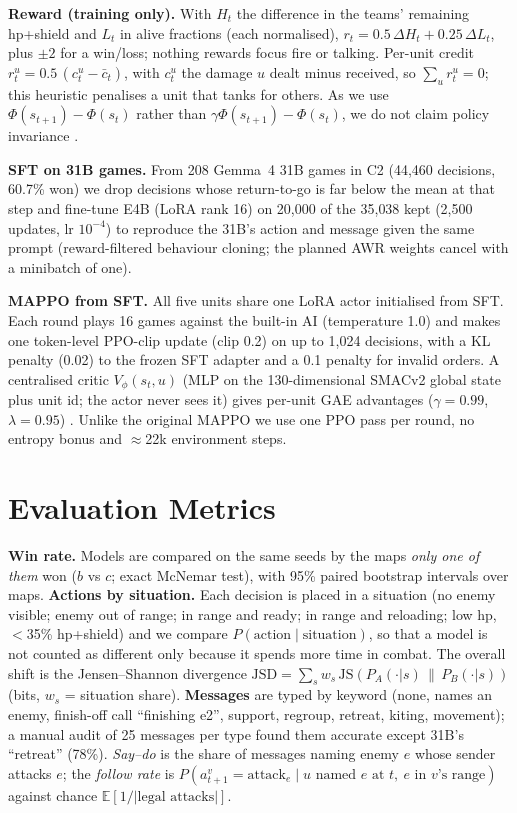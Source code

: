 \documentclass{article} %
\begin{document}
\textbf{Reward (training only).} With $H_t$ the difference in the teams' remaining hp+shield and $L_t$
in alive fractions (each normalised), $r_t = 0.5\,\Delta H_t + 0.25\,\Delta L_t$, plus $\pm2$ for a
win/loss; nothing rewards focus fire or talking. Per-unit credit $r_t^u = 0.5\,(c_t^u-\bar c_t)$, with
$c_t^u$ the damage $u$ dealt minus received, so $\sum_u r_t^u=0$; this heuristic penalises a unit that
tanks for others. As we use $\Phi(s_{t+1})-\Phi(s_t)$ rather than $\gamma\Phi(s_{t+1})-\Phi(s_t)$, we
do not claim policy invariance \citep{ng1999shaping}.

\textbf{SFT on 31B games.} From 208 Gemma~4 31B games in C2 (44{,}460 decisions, 60.7\% won) we drop
decisions whose return-to-go is far below the mean at that step and fine-tune E4B (LoRA rank 16) on
20{,}000 of the 35{,}038 kept (2{,}500 updates, lr $10^{-4}$) to reproduce the 31B's action and message
given the same prompt (reward-filtered behaviour cloning; the planned AWR weights \citep{peng2019awr}
cancel with a minibatch of one).

\textbf{MAPPO from SFT.} All five units share one LoRA actor initialised from SFT. Each round plays 16
games against the built-in AI (temperature 1.0) and makes one token-level PPO-clip update
\citep{schulman2017ppo} (clip 0.2) on up to 1{,}024 decisions, with a KL penalty (0.02) to the frozen
SFT adapter and a 0.1 penalty for invalid orders. A centralised critic $V_\phi(s_t,u)$ (MLP on the
130-dimensional SMACv2 global state plus unit id; the actor never sees it) gives per-unit GAE
advantages \citep{schulman2015gae} ($\gamma{=}0.99$, $\lambda{=}0.95$) \citep{yu2022mappo}. Unlike the
original MAPPO we use one PPO pass per round, no entropy bonus and $\approx$22k environment steps.

\section{Evaluation Metrics}
\textbf{Win rate.} Models are compared on the same seeds by the maps \emph{only one of them} won ($b$ vs
$c$; exact McNemar test), with 95\% paired bootstrap intervals over maps. \textbf{Actions by situation.}
Each decision is placed in a situation (no enemy visible; enemy out of range; in range and ready; in
range and reloading; low hp, $<$35\% hp+shield) and we compare $P(\text{action}\mid\text{situation})$,
so that a model is not counted as different only because it spends more time in combat. The overall
shift is the Jensen--Shannon divergence $\mathrm{JSD}=\sum_s w_s\,\mathrm{JS}(P_A(\cdot|s)\,\|\,P_B(\cdot|s))$
(bits, $w_s$ = situation share). \textbf{Messages} are typed by keyword (none, names an enemy,
finish-off call ``finishing e2'', support, regroup, retreat, kiting, movement); a manual audit of 25
messages per type found them accurate except 31B's ``retreat'' (78\%). \emph{Say--do} is the share of
messages naming enemy $e$ whose sender attacks $e$; the \emph{follow rate} is
$P(a^{v}_{t+1}{=}\text{attack}_e \mid u \text{ named } e \text{ at } t,\ e \text{ in } v\text{'s range})$
against chance $\mathbb{E}[1/|\text{legal attacks}|]$.
\end{document}

